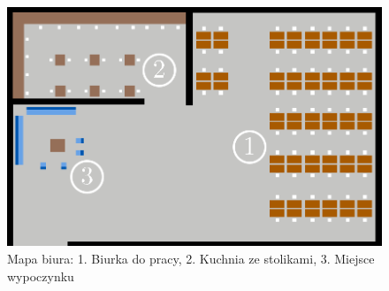 \begin{figure}[h!]
	\includegraphics[width=\linewidth]{mapWithNumbers.png}
	\caption{Mapa biura: 1. Biurka do pracy, 2. Kuchnia ze stolikami, 3. Miejsce wypoczynku}
	\label{fig:simMap}
\end{figure}


%
%
%
%
%        


